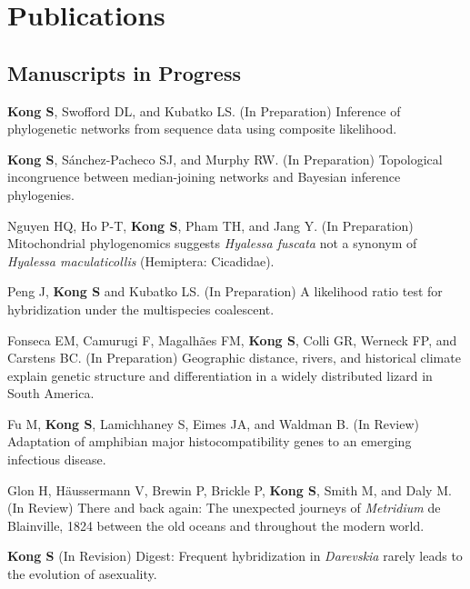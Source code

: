 \documentclass[11pt]{article}
\begin{document}
\hspace{0pt}


\section*{Publications}
\subsection*{Manuscripts in Progress}
\begin{etaremune}




	\item \textbf{Kong S}, Swofford DL, and Kubatko LS. (In Preparation) Inference of phylogenetic networks from sequence data using composite likelihood. %

	\item \textbf{Kong S}, Sánchez-Pacheco SJ, and Murphy RW. (In Preparation) Topological incongruence between median-joining networks and Bayesian inference phylogenies. %

	\item Nguyen HQ, Ho P-T, \textbf{Kong S}, Pham TH, and Jang Y. (In Preparation) Mitochondrial phylogenomics suggests \textit{Hyalessa fuscata} not a synonym of \textit{Hyalessa maculaticollis} (Hemiptera: Cicadidae).
	
	\item Peng J, \textbf{Kong S} and Kubatko LS. (In Preparation) A likelihood ratio test for hybridization under the multispecies coalescent. %
		
	\item Fonseca EM, Camurugi F, Magalhães FM, \textbf{Kong S}, Colli GR, Werneck FP, and Carstens BC. (In Preparation) Geographic distance, rivers, and historical climate explain genetic structure and differentiation in a widely distributed lizard in South America. %

	\item Fu M, \textbf{Kong S}, Lamichhaney S, Eimes JA, and Waldman B. (In Review) Adaptation of amphibian major histocompatibility genes to an emerging infectious disease. %
	
	\item Glon H, Häussermann V, Brewin P, Brickle P, \textbf{Kong S}, Smith M, and Daly M. (In Review) There and back again: The unexpected journeys of \textit{Metridium} de Blainville, 1824 between the old oceans and throughout the modern world. %
		
	\item \textbf{Kong S} (In Revision) Digest: Frequent hybridization in \textit{Darevskia} rarely leads to the evolution of asexuality. %

	
\end{etaremune}
\end{document}

